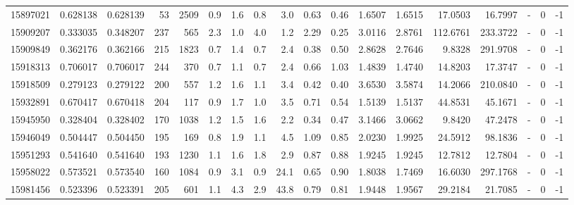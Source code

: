 \begin{tabular}{rrrrrrrrrrrrrrrlrr}
  15897021 & 0.628138 &   0.628139 &   53 & 2509 &      0.9 &      1.6 &     0.8 &      3.0 &       0.63 &        0.46 &  1.6507 &  1.6515 &   17.0503 &   16.7997 &             - &        0 &         -1 \\
  15909207 & 0.333035 &   0.348207 &  237 &  565 &      2.3 &      1.0 &     4.0 &      1.2 &       2.29 &        0.25 &  3.0116 &  2.8761 &  112.6761 &  233.3722 &             - &        0 &         -1 \\
  15909849 & 0.362176 &   0.362166 &  215 & 1823 &      0.7 &      1.4 &     0.7 &      2.4 &       0.38 &        0.50 &  2.8628 &  2.7646 &    9.8328 &  291.9708 &             - &        0 &         -1 \\
  15918313 & 0.706017 &   0.706017 &  244 &  370 &      0.7 &      1.1 &     0.7 &      2.4 &       0.66 &        1.03 &  1.4839 &  1.4740 &   14.8203 &   17.3747 &             - &        0 &         -1 \\
  15918509 & 0.279123 &   0.279122 &  200 &  557 &      1.2 &      1.6 &     1.1 &      3.4 &       0.42 &        0.40 &  3.6530 &  3.5874 &   14.2066 &  210.0840 &             - &        0 &         -1 \\
  15932891 & 0.670417 &   0.670418 &  204 &  117 &      0.9 &      1.7 &     1.0 &      3.5 &       0.71 &        0.54 &  1.5139 &  1.5137 &   44.8531 &   45.1671 &             - &        0 &         -1 \\
  15945950 & 0.328404 &   0.328402 &  170 & 1038 &      1.2 &      1.5 &     1.6 &      2.2 &       0.34 &        0.47 &  3.1466 &  3.0662 &    9.8420 &   47.2478 &             - &        0 &         -1 \\
  15946049 & 0.504447 &   0.504450 &  195 &  169 &      0.8 &      1.9 &     1.1 &      4.5 &       1.09 &        0.85 &  2.0230 &  1.9925 &   24.5912 &   98.1836 &             - &        0 &         -1 \\
  15951293 & 0.541640 &   0.541640 &  193 & 1230 &      1.1 &      1.6 &     1.8 &      2.9 &       0.87 &        0.88 &  1.9245 &  1.9245 &   12.7812 &   12.7804 &             - &        0 &         -1 \\
  15958022 & 0.573521 &   0.573540 &  160 & 1084 &      0.9 &      3.1 &     0.9 &     24.1 &       0.65 &        0.90 &  1.8038 &  1.7469 &   16.6030 &  297.1768 &             - &        0 &         -1 \\
  15981456 & 0.523396 &   0.523391 &  205 &  601 &      1.1 &      4.3 &     2.9 &     43.8 &       0.79 &        0.81 &  1.9448 &  1.9567 &   29.2184 &   21.7085 &             - &        0 &         -1 \\

\end{tabular}
